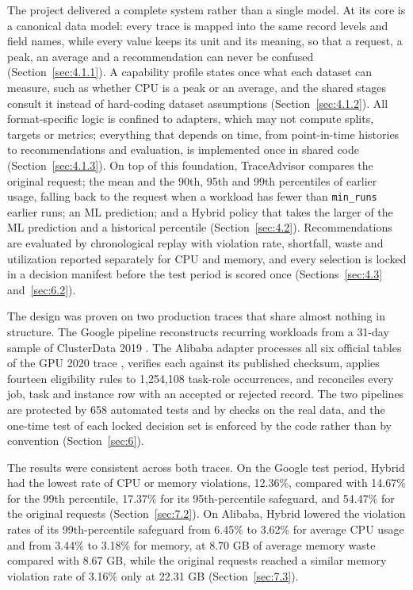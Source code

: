 \documentclass{IEEEtran}
\begin{document}
The project delivered a complete system rather than a single model. At its core is a canonical data model: every trace is mapped into the same record levels and field names, while every value keeps its unit and its meaning, so that a request, a peak, an average and a recommendation can never be confused (Section~\ref{sec:4.1.1}). A capability profile states once what each dataset can measure, such as whether CPU is a peak or an average, and the shared stages consult it instead of hard-coding dataset assumptions (Section~\ref{sec:4.1.2}). All format-specific logic is confined to adapters, which may not compute splits, targets or metrics; everything that depends on time, from point-in-time histories to recommendations and evaluation, is implemented once in shared code (Section~\ref{sec:4.1.3}). On top of this foundation, TraceAdvisor compares the original request; the mean and the 90th, 95th and 99th percentiles of earlier usage, falling back to the request when a workload has fewer than \texttt{min\_runs} earlier runs; an ML prediction; and a Hybrid policy that takes the larger of the ML prediction and a historical percentile (Section~\ref{sec:4.2}). Recommendations are evaluated by chronological replay with violation rate, shortfall, waste and utilization reported separately for CPU and memory, and every selection is locked in a decision manifest before the test period is scored once (Sections~\ref{sec:4.3} and~\ref{sec:6.2}).

The design was proven on two production traces that share almost nothing in structure. The Google pipeline reconstructs recurring workloads from a 31-day sample of ClusterData 2019 \cite{ref7}. The Alibaba adapter processes all six official tables of the GPU 2020 trace \cite{ref19}, verifies each against its published checksum, applies fourteen eligibility rules to 1,254,108 task-role occurrences, and reconciles every job, task and instance row with an accepted or rejected record. The two pipelines are protected by 658 automated tests and by checks on the real data, and the one-time test of each locked decision set is enforced by the code rather than by convention (Section~\ref{sec:6}).

The results were consistent across both traces. On the Google test period, Hybrid had the lowest rate of CPU or memory violations, 12.36\%, compared with 14.67\% for the 99th percentile, 17.37\% for its 95th-percentile safeguard, and 54.47\% for the original requests (Section~\ref{sec:7.2}). On Alibaba, Hybrid lowered the violation rates of its 99th-percentile safeguard from 6.45\% to 3.62\% for average CPU usage and from 3.44\% to 3.18\% for memory, at 8.70 GB of average memory waste compared with 8.67 GB, while the original requests reached a similar memory violation rate of 3.16\% only at 22.31 GB (Section~\ref{sec:7.3}).
\end{document}
